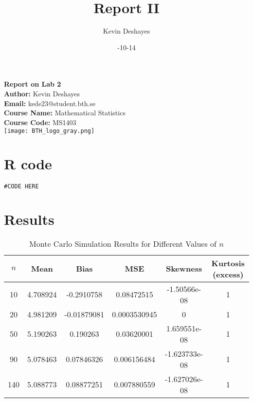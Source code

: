 \documentclass{report}
\title{Report II}
\author{Kevin Deshayes}
\date{\2024-10-14}
\begin{document}
\begin{titlepage}
  \centering
  {\huge\bfseries Report on Lab 2 \\[1cm]}  %
  \textbf{Author:} Kevin Deshayes\\[0.5cm]  %
  \textbf{Email:} kede23@student.bth.se\\[0.5cm]  %
  \textbf{Course Name:} Mathematical Statistics \\[0.5cm]  %
  \textbf{Course Code:} MS1403\\[1.5cm]  %

  \texttt{[image: BTH\_logo\_gray.png]} %
  \vfill
  \vspace{2cm}
\end{titlepage}

\tableofcontents
\newpage
\section{R code}



\begin{verbatim}
#CODE HERE
\end{verbatim}

\section{Results}
\begin{table}[htbp]
  \centering
  \begin{tabular}{|c|c|c|c|c|c|}
    \hline
    $n$ & Mean     & Bias        & MSE          & Skewness      & Kurtosis (excess) \\
    \hline
    10  & 4.708924 & -0.2910758  & 0.08472515   & -1.50566e-08  & 1                 \\
    20  & 4.981209 & -0.01879081 & 0.0003530945 & 0             & 1                 \\
    50  & 5.190263 & 0.190263    & 0.03620001   & 1.659551e-08  & 1                 \\
    90  & 5.078463 & 0.07846326  & 0.006156484  & -1.623733e-08 & 1                 \\
    140 & 5.088773 & 0.08877251  & 0.007880559  & -1.627026e-08 & 1                 \\
    \hline
  \end{tabular}
  \caption{Monte Carlo Simulation Results for Different Values of $n$}
\end{table}
\end{document}
